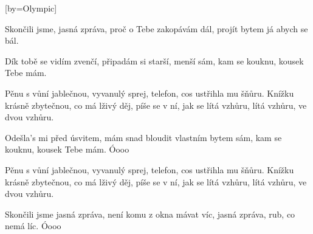 [by={Olympic}]

\beginverse{}
Skončili jsme, jasná zpráva,
proč o Tebe zakopávám dál,
projít bytem já abych se bál.
\endverse{}

\beginverse{}
Dík tobě se vidím zvenčí,
připadám si starší, menší sám,
kam se kouknu, kousek Tebe mám.
\endverse{}

\beginchorus{}
Pěnu s vůní jablečnou, vyvanulý sprej,
telefon, cos ustřihla mu šňůru.
Knížku krásně zbytečnou, co má lživý děj,
píše se v ní, jak se lítá vzhůru,
lítá vzhůru, ve dvou vzhůru.
\endchorus{}

\beginverse{}
Odešla's mi před úsvitem,
mám snad bloudit vlastním bytem sám,
kam se kouknu, kousek Tebe mám. Óooo
\endverse{}

\beginchorus{}
Pěnu s vůní jablečnou, vyvanulý sprej,
telefon, cos ustřihla mu šňůru.
Knížku krásně zbytečnou, co má lživý děj,
píše se v ní, jak se lítá vzhůru,
lítá vzhůru, ve dvou vzhůru.
\endchorus{}

\beginverse{}
Skončili jsme jasná zpráva,
není komu z okna mávat víc,
jasná zpráva, rub, co nemá líc. Óooo
\endverse{}

\endsong{}
